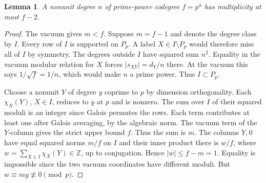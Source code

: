 \documentclass[11pt]{amsart}
\numberwithin{equation}{section}
\newtheorem{lemma}[theorem]{Lemma}
\begin{document}
\begin{lemma}\label{sq:saturation}
A nonunit degree $n$ of prime-power codegree $f=p^a$ has multiplicity at most $f-2$.
\end{lemma}
\begin{proof}
The vacuum gives $m<f$. Suppose $m=f-1$ and denote the degree class by $I$. Every row of $I$ is supported on $P_p$. A label $X\in I\setminus P_p$ would therefore miss all of $I$ by symmetry. The degrees outside $I$ have squared sum $n^2$. Equality in the vacuum modular relation for $X$ forces $|s_{XY}|=d_Y/n$ there. At the vacuum this says $1/\sqrt f=1/n$, which would make $n$ a prime power. Thus $I\subset P_p$.

Choose a nonunit $Y$ of degree $y$ coprime to $p$ by dimension orthogonality. Each $\chi_X(Y)$, $X\in I$, reduces to $y$ at $p$ and is nonzero. The sum over $I$ of their squared moduli is an integer since Galois permutes the rows. Each term contributes at least one after Galois averaging, by the algebraic norm. The vacuum term of the $Y$-column gives the strict upper bound $f$. Thus the sum is $m$. The columns $Y,0$ have equal squared norms $m/f$ on $I$ and their inner product there is $w/f$, where $w=\sum_{X\in I}\chi_X(Y)\in\mathbb Z$, up to conjugation. Hence $|w|\le f-m=1$. Equality is impossible since the two vacuum coordinates have different moduli. But $w\equiv my\not\equiv0\pmod p$.
\end{proof}
\end{document}
